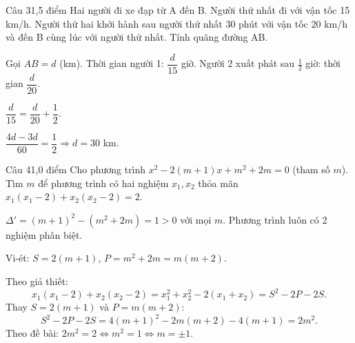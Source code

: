 \begin{de_cau}{Câu 3}{1,5 điểm}
Hai người đi xe đạp từ A đến B. Người thứ nhất đi với vận tốc 15 km/h. Người thứ hai khởi hành sau
người thứ nhất 30 phút với vận tốc 20 km/h và đến B cùng lúc với người thứ nhất. Tính quãng đường AB.
\end{de_cau}

\begin{loi_giai_cau}
Gọi $AB=d$ (km). Thời gian người 1: $\dfrac{d}{15}$ giờ. Người 2 xuất phát sau $\frac{1}{2}$ giờ: thời gian $\dfrac{d}{20}$.

$\dfrac{d}{15} = \dfrac{d}{20}+\dfrac{1}{2}$.

$\dfrac{4d-3d}{60}=\dfrac{1}{2}\Rightarrow d=30$ km.
\end{loi_giai_cau}

\begin{de_cau}{Câu 4}{1,0 điểm}
Cho phương trình $x^2-2(m+1)x+m^2+2m=0$ (tham số $m$). Tìm $m$ để phương trình có hai nghiệm
$x_1, x_2$ thỏa mãn $x_1(x_1-2)+x_2(x_2-2)=2$.
\end{de_cau}

\begin{loi_giai_cau}
$\Delta'=(m+1)^2-(m^2+2m)=1>0$ với mọi $m$. Phương trình luôn có 2 nghiệm phân biệt.

Vi-ét: $S=2(m+1)$, $P=m^2+2m=m(m+2)$.

Theo giả thiết:
\[x_1(x_1-2)+x_2(x_2-2) = x_1^2+x_2^2-2(x_1+x_2) = S^2-2P-2S.\]
Thay $S = 2(m+1)$ và $P = m(m+2)$:
\[S^2-2P-2S = 4(m+1)^2-2m(m+2)-4(m+1) = 2m^2.\]
Theo đề bài: $2m^2 = 2 \Leftrightarrow m^2 = 1 \Leftrightarrow \boxed{m=\pm 1}$.
\end{loi_giai_cau}
